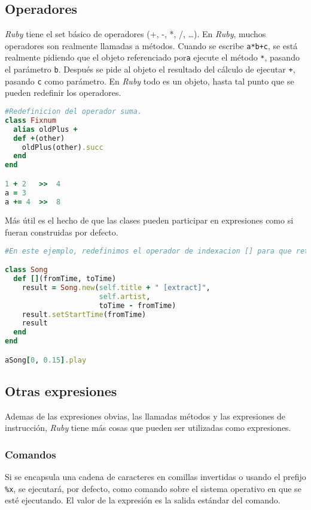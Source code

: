 \subsection{Operadores}
\textit{Ruby} tiene el set básico de operadores (+, -, *, /, \ldots). En \textit{Ruby}, muchos operadores son realmente llamadas a métodos. Cuando se escribe \texttt{a*b+c}, se está realmente pidiendo que el objeto referenciado por\texttt{a} ejecute el método \texttt{*}, pasando el parámetro \texttt{b}. Después se pide al objeto el resultado del cálculo de ejecutar \texttt{+}, pasando \texttt{c} como parámetro. En \textit{Ruby} todo es un objeto, hasta tal punto que se pueden redefinir los operadores.

\begin{lstlisting}[language=Ruby]
#Redefinicion del operador suma.
class Fixnum
  alias oldPlus +
  def +(other)
    oldPlus(other).succ
  end
end

1 + 2	>>	4
a = 3
a += 4	>>	8
\end{lstlisting}

Más útil es el hecho de que las clases pueden participar en expresiones como si fueran construidas por defecto.

\begin{lstlisting}[language=Ruby]
#En este ejemplo, redefinimos el operador de indexacion [] para que retorne una seccion de una cancion.

class Song
  def [](fromTime, toTime)
    result = Song.new(self.title + " [extract]",
                      self.artist,
                      toTime - fromTime)
    result.setStartTime(fromTime)
    result
  end
end

aSong[0, 0.15].play
\end{lstlisting}

\subsection{Otras expresiones}
Ademas de las expresiones obvias, las llamadas métodos y las expresiones de instrucción, \textit{Ruby} tiene más cosas que pueden ser utilizadas como expresiones.

\subsubsection{Comandos}
Si se encapsula una cadena de caracteres en comillas invertidas o usando el prefijo \texttt{\%x}, se ejecutará, por defecto, como comando sobre el sistema operativo en que se esté ejecutando. El valor de la expresión es la salida estándar del comando.

